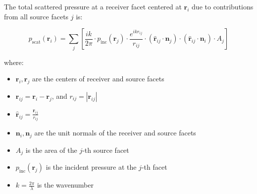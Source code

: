 \documentclass{article}
\begin{document}
The total scattered pressure at a receiver facet centered at \( \mathbf{r}_i \) due to contributions from all source facets \( j \) is:

\[
p_{\text{scat}}(\mathbf{r}_i) = \sum_{j}
\left[
\frac{ik}{2\pi} \cdot
p_{\text{inc}}(\mathbf{r}_j) \cdot
\frac{e^{ik r_{ij}}}{r_{ij}} \cdot
(\hat{\mathbf{r}}_{ij} \cdot \mathbf{n}_j) \cdot
(\hat{\mathbf{r}}_{ij} \cdot \mathbf{n}_i) \cdot
A_j
\right]
\]

where:

\begin{itemize}
    \item \( \mathbf{r}_i, \mathbf{r}_j \) are the centers of receiver and source facets
    \item \( \mathbf{r}_{ij} = \mathbf{r}_i - \mathbf{r}_j \), and \( r_{ij} = |\mathbf{r}_{ij}| \)
    \item \( \hat{\mathbf{r}}_{ij} = \frac{\mathbf{r}_{ij}}{r_{ij}} \)
    \item \( \mathbf{n}_i, \mathbf{n}_j \) are the unit normals of the receiver and source facets
    \item \( A_j \) is the area of the \( j \)-th source facet
    \item \( p_{\text{inc}}(\mathbf{r}_j) \) is the incident pressure at the \( j \)-th facet
    \item \( k = \frac{2\pi}{\lambda} \) is the wavenumber
\end{itemize}
\end{document}
